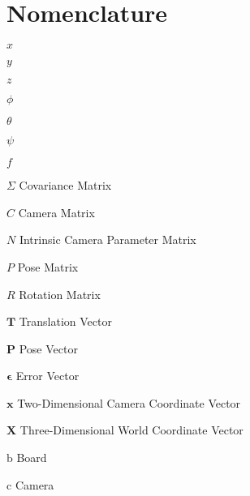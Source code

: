 \chapter{Nomenclature}

\begin{Nomencl}

   \item[$x$]         
   \item[$y$]         
   \item[$z$]         
   \item[$\phi$]      
   \item[$\theta$]    
   \item[$\psi$]      \\
   \item[$f$]	      

   \item[$\Sigma$] 	Covariance Matrix
   \item[$C$]		Camera Matrix
   \item[$N$]		Intrinsic Camera Parameter Matrix
   \item[$P$]		Pose Matrix
   \item[$R$]		Rotation Matrix
   \item[$\bm{T}$]	Translation Vector
   \item[$\bm{P}$]	Pose Vector
   \item[$\bm{\epsilon}$]	Error Vector
   \item[$\bm{x}$]	Two-Dimensional Camera Coordinate Vector
   \item[$\bm{X}$]	Three-Dimensional World Coordinate Vector

   \item[$\mathrm{b}$]          Board
   \item[$\mathrm{c}$] 		Camera


\end{Nomencl}
